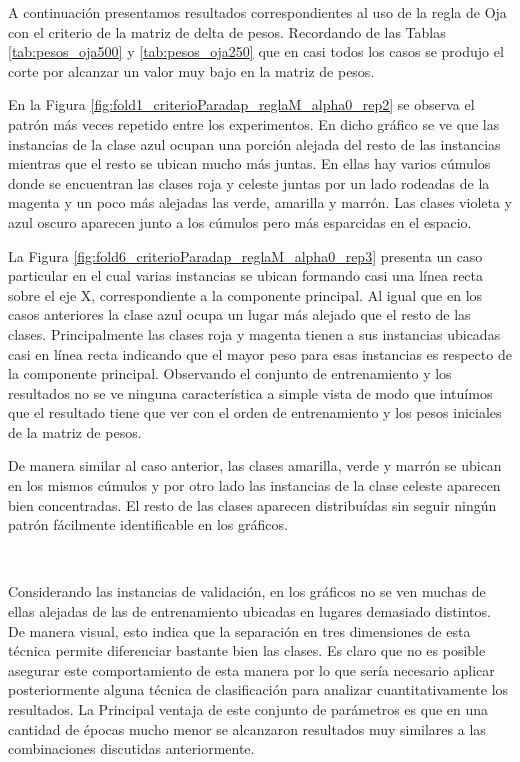 \documentclass[informe.tex]{subfiles}
\begin{document}
      
      
      
      
      
      
      
      
	A continuación presentamos resultados correspondientes al uso de la regla de Oja con el criterio de la matriz de delta de pesos. Recordando de las Tablas \ref{tab:pesos_oja500} y \ref{tab:pesos_oja250} que en casi todos los casos se produjo el corte por alcanzar un valor muy bajo en la matriz de pesos.
	
	En la Figura \ref{fig:fold1_criterioParadap_reglaM_alpha0_rep2} se observa el patrón más veces repetido entre los experimentos. En dicho gráfico se ve que las instancias de la clase azul ocupan una porción alejada del resto de las instancias mientras que el resto se ubican mucho más juntas. En ellas hay varios cúmulos donde se encuentran las clases roja y celeste juntas por un lado rodeadas de la magenta y un poco más alejadas las verde, amarilla y marrón. Las clases violeta y azul oscuro aparecen junto a los cúmulos pero más esparcidas en el espacio.
	
	La Figura \ref{fig:fold6_criterioParadap_reglaM_alpha0_rep3} presenta un caso particular en el cual varias instancias se ubican formando casi una línea recta sobre el eje X, correspondiente a la componente principal. Al igual que en los casos anteriores la clase azul ocupa un lugar más alejado que el resto de las clases. Principalmente las clases roja y magenta tienen a sus instancias ubicadas casi en línea recta indicando que el mayor peso para esas instancias es respecto de la componente principal. Observando el conjunto de entrenamiento y los resultados no se ve ninguna característica a simple vista de modo que intuímos que el resultado tiene que ver con el orden de entrenamiento y los pesos iniciales de la matriz de pesos.
	
	De manera similar al caso anterior, las clases amarilla, verde y marrón se ubican en los mismos cúmulos y por otro lado las instancias de la clase celeste aparecen bien concentradas. El resto de las clases aparecen distribuídas sin seguir ningún patrón fácilmente identificable en los gráficos.
	
	~
	
	Considerando las instancias de validación, en los gráficos no se ven muchas de ellas alejadas de las de entrenamiento ubicadas en lugares demasiado distintos. De manera visual, esto indica que la separación en tres dimensiones de esta técnica permite diferenciar bastante bien las clases. Es claro que no es posible asegurar este comportamiento de esta manera por lo que sería necesario aplicar posteriormente alguna técnica de clasificación para analizar cuantitativamente los resultados. La Principal ventaja de este conjunto de parámetros es que en una cantidad de épocas mucho menor se alcanzaron resultados muy similares a las combinaciones discutidas anteriormente.
      
\end{document}
